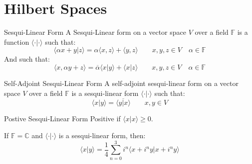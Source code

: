     \section{Hilbert Spaces}
        \begin{ldefinition}{Sesqui-Linear Form}
            A Sesqui-Linear form on a vector space $V$ over a
            field $\mathbb{F}$ is a function
            $\langle{\cdot|\cdot}\rangle$ such that:
            \begin{equation}
                \langle{\alpha{x}+y|z}\rangle
                =\alpha\langle{x,z}\rangle+\langle{y,z}\rangle
                \quad\quad
                x,y,z\in{V}
                \quad
                \alpha\in\mathbb{F}
            \end{equation}
            And such that:
            \begin{equation}
                \langle{x,\alpha{y}+z}\rangle
                =\overline{\alpha}\langle{x|y}\rangle
                +\langle{x|z}\rangle
               \quad\quad
                x,y,z\in{V}
                \quad
                \alpha\in\mathbb{F}
            \end{equation}
        \end{ldefinition}
        \begin{ldefinition}{Self-Adjoint Sesqui-Linear Form}
            A self-adjoint sesqui-linear form on a vector space
            $V$ over a field $\mathbb{F}$ is a sesqui-linear
            form $\langle{\cdot|\cdot}\rangle$ such that:
            \begin{equation}
                \langle{x|y}\rangle=\overline{\langle{y|x}\rangle}
                \quad\quad
                x,y\in{V}
            \end{equation}
        \end{ldefinition}
        \begin{ldefinition}{Postive Sesqui-Linear Form}
            Positive if $\langle{x|x}\rangle\geq{0}$.
        \end{ldefinition}
        \begin{theorem}
            If $\mathbb{F}=\mathbb{C}$ and
            $\langle{\cdot|\cdot}\rangle$ is a sesqui-linear
            form, then:
            \begin{equation}
                \langle{x|y}\rangle
                =\frac{1}{4}\sum_{n=0}^{3}
                    i^{n}\langle{x+i^{n}y|x+i^{n}y}\rangle
            \end{equation}
        \end{theorem}
